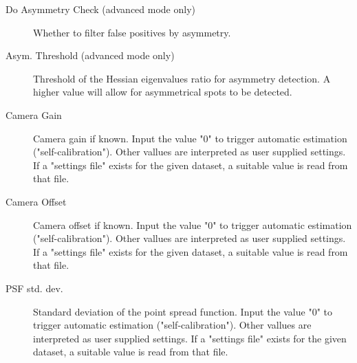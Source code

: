 \documentclass[a4paper,12pt,notitlepage]{report}
\begin{document}
\begin{description}
    \item[Do Asymmetry Check (advanced mode only)] Whether to filter false positives by asymmetry.
    \item[Asym. Threshold (advanced mode only)] Threshold of the Hessian eigenvalues ratio for asymmetry detection. A higher value will allow for asymmetrical spots to be detected.
    \item[Camera Gain] Camera gain if known. Input the value "0" to trigger automatic estimation ("self-calibration"). Other vallues are interpreted as user supplied settings. If a "settings file" exists for the given dataset, a suitable value is read from that file.
    \item[Camera Offset] Camera offset if known. Input the value "0" to trigger automatic estimation ("self-calibration"). Other vallues are interpreted as user supplied settings. If a "settings file" exists for the given dataset, a suitable value is read from that file.
    \item[PSF std. dev.] Standard deviation of the point spread function. Input the value "0" to trigger automatic estimation ("self-calibration"). Other vallues are interpreted as user supplied settings. If a "settings file" exists for the given dataset, a suitable value is read from that file.
\end{description}
\end{document}
